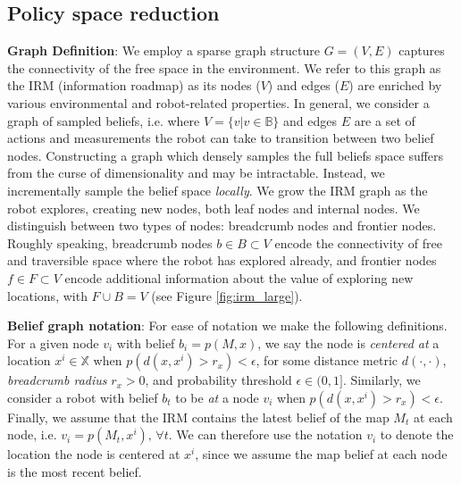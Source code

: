 \documentclass{article}
\newcommand{\ph}[1]{{\textbf{#1}:}} %
\begin{document}
\subsection{Policy space reduction}


\ph{Graph Definition}
We employ a sparse graph structure $G = (V, E)$ captures the connectivity of the free space in the environment.  We refer to this graph as the IRM (information roadmap) as its nodes ($V$) and edges ($E$) are enriched by various environmental and robot-related properties.  In general, we consider a graph of sampled beliefs, i.e. where $V=\{v|v\in\mathbb{B}\}$ and edges $E$ are a set of actions and measurements the robot can take to transition between two belief nodes. Constructing a graph which densely samples the full beliefs space suffers from the curse of dimensionality and may be intractable.  Instead, we incrementally sample the belief space \textit{locally}.  We grow the IRM graph as the robot explores, creating new nodes, both leaf nodes and internal nodes.  We distinguish between two types of nodes:  breadcrumb nodes and frontier nodes.  Roughly speaking, breadcrumb nodes $b\in B \subset V$ encode the connectivity of free and traversible space where the robot has explored already, and frontier nodes $f\in F\subset V$ encode additional information about the value of exploring new locations, with $F\cup B = V$ (see Figure \ref{fig:irm_large}).

\ph{Belief graph notation}
For ease of notation we make the following definitions.  For a given node $v_i$ with belief $b_i = p(M,x)$, we say the node is \textit{centered at} a location $x^i\in\mathbb{X}$ when $p(d(x,x^i)>r_x)<\epsilon$, for some distance metric $d(\cdot,\cdot)$, \textit{breadcrumb radius} $r_x>0$, and probability threshold $\epsilon\in(0,1]$.  Similarly, we consider a robot with belief $b_t$ to be \textit{at} a node $v_i$ when $p(d(x,x^i)>r_x)<\epsilon$.  Finally, we assume that the IRM contains the latest belief of the map $M_t$ at each node, i.e. $v_i=p(M_t,x^i),\,\forall t$.  We can therefore use the notation $v_i$ to denote the location the node is centered at $x^i$, since we assume the map belief at each node is the most recent belief.
\end{document}
